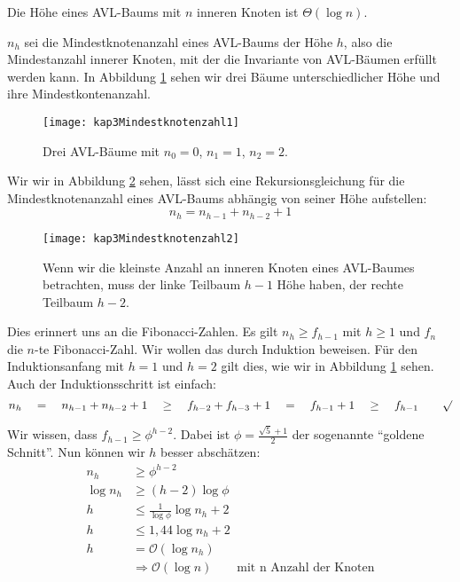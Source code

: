 \begin{Beh}
\hspace{\parindent}Die Höhe eines AVL-Baums mit $n$ inneren Knoten ist $\Theta(\log n)$.
\end{Beh}
\begin{Bew}
\hspace{\parindent}$n_h$ sei die Mindestknotenanzahl eines AVL-Baums der Höhe $h$, also die Mindestanzahl innerer Knoten, mit der die Invariante von AVL-Bäumen erfüllt werden kann. In Abbildung \ref{kap3Mindestknotenzahl1} sehen wir drei Bäume unterschiedlicher Höhe und ihre Mindestkontenanzahl.

\begin{figure}[hbt]
  \centering
  \texttt{[image: kap3Mindestknotenzahl1]}
  \caption{Drei AVL-Bäume mit $n_0 = 0$, $n_1 = 1$, $n_2 = 2$.}
  \label{kap3Mindestknotenzahl1}
\end{figure}

Wir wir in Abbildung \ref{kap3Mindestknotenzahl2} sehen, lässt sich eine Rekursionsgleichung für die Mindestknotenanzahl eines AVL-Baums abhängig von seiner Höhe aufstellen:
\[ n_h = n_{h-1} + n_{h-2} + 1 \]

\begin{figure}[hbt]
  \centering
  \texttt{[image: kap3Mindestknotenzahl2]}
  \caption{Wenn wir die kleinste Anzahl an inneren Knoten eines AVL-Baumes betrachten, muss der linke Teilbaum $h-1$ Höhe haben, der rechte Teilbaum $h-2$.}
  \label{kap3Mindestknotenzahl2}
\end{figure}

Dies erinnert uns an die Fibonacci-Zahlen. Es gilt $n_h \ge f_{h-1}$ mit $h \ge 1$ und $f_n$ die $n$-te Fibonacci-Zahl. Wir wollen das durch Induktion beweisen. Für den Induktionsanfang mit $h=1$ und $h=2$ gilt dies, wie wir in Abbildung \ref{kap3Mindestknotenzahl1} sehen. Auch der Induktionsschritt ist einfach:
\[ n_h \quad=\quad n_{h-1} + n_{h-2} + 1 \quad\ge\quad f_{h-2} + f_{h-3} + 1 \quad=\quad f_{h-1} + 1 \quad\ge\quad f_{h-1} \qquad \surd \]

Wir wissen, dass $f_{h-1} \ge \phi^{h-2}$. Dabei ist $\phi = \frac{\sqrt{5} +1}{2}$ der sogenannte "`goldene Schnitt"'. Nun können wir $h$ besser abschätzen:
\begin{align*}
  n_h &\ge \phi^{h-2} \\
  \log n_h &\ge (h-2) \log \phi \\
  h &\le \frac{1}{\log \phi} \log n_h +2 \\
  h &\le 1,44 \log n_h + 2\\
  h &= \mathcal{O}(\log n_h)\\
  &\Rightarrow \mathcal{O}(\log n) \qquad\text{mit n Anzahl der Knoten}
\end{align*}
\end{Bew}

